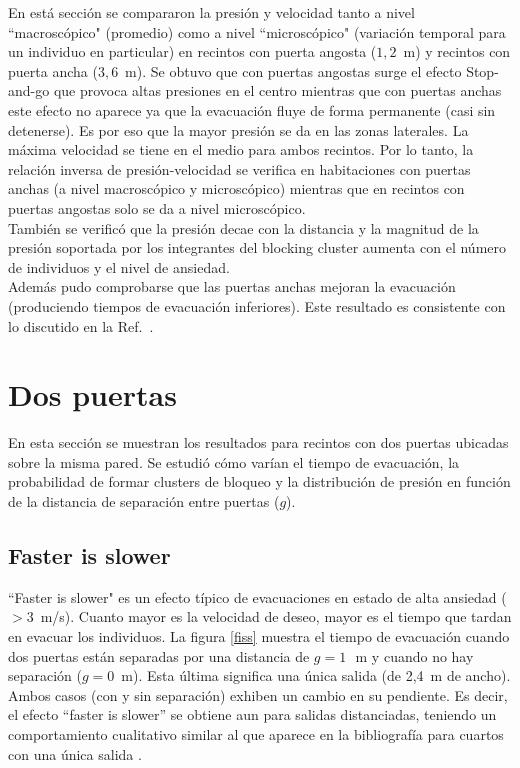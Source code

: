 En está sección se compararon la presión y velocidad tanto a nivel ``macroscópico" (promedio) como a nivel ``microscópico" (variación temporal para un individuo en particular) en recintos con puerta angosta ($1,2$~m) y recintos con puerta ancha ($3,6$~m). Se obtuvo que con puertas angostas surge el efecto Stop-and-go que provoca altas presiones en el centro mientras que con puertas anchas este efecto no aparece ya que la evacuación fluye de forma permanente (casi sin detenerse). Es por eso que la mayor presión se da en las zonas laterales. La máxima velocidad se tiene en el medio para ambos recintos. Por lo tanto, la relación inversa de presión-velocidad se verifica en habitaciones con puertas anchas (a nivel macroscópico y microscópico) mientras que en recintos con puertas angostas solo se da a nivel microscópico.\\

También se verificó que la presión decae con la distancia y la magnitud de la presión soportada por los integrantes del blocking cluster aumenta con el número de individuos y el nivel de ansiedad.\\

Además pudo comprobarse que las puertas anchas mejoran la evacuación (produciendo tiempos de evacuación inferiores). Este resultado es consistente con lo discutido en la Ref.~\cite{huanhuan1}.  

\newpage

\section{\label{dos_puertas} Dos puertas}

En esta sección se muestran los resultados para recintos con dos puertas ubicadas sobre la misma pared. Se estudió cómo varían el tiempo de evacuación, la probabilidad de formar clusters de bloqueo y la distribución de presión en función de la distancia de separación entre puertas ($g$).  

\subsection{Faster is slower}

``Faster is slower" es un efecto típico de evacuaciones en estado de alta ansiedad ($>$3~m/s). Cuanto mayor es la velocidad de deseo, mayor es el tiempo que tardan en evacuar los individuos. 
La figura \ref{fiss} muestra el tiempo de evacuación cuando dos puertas están separadas por una distancia de $g=1\,$~m 
y cuando no hay separación ($g=0$~m). Esta última significa una única salida (de 2,4~m de ancho). Ambos casos (con y sin separación) exhiben un cambio en su pendiente. Es decir, el efecto ``faster is slower'' se obtiene aun para salidas distanciadas, teniendo un comportamiento cualitativo similar al que aparece en la bibliografía para cuartos con una única salida \cite{Helbing1,Dorso1}.\\ 

